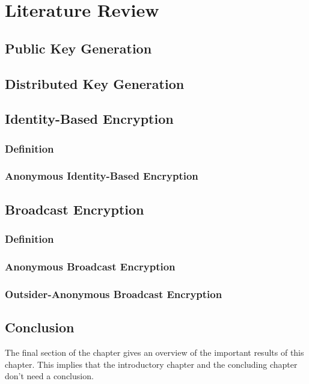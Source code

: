 \chapter{Literature Review}
\label{cha:2}
\lipsum[77]

\section{Public Key Generation}
\lipsum[84]

\section{Distributed Key Generation}
\lipsum[85]

\section{Identity-Based Encryption}
\lipsum[78]

\subsection{Definition}
\lipsum[79]

\subsection{Anonymous Identity-Based Encryption}
\lipsum[80]

\section{Broadcast Encryption}
\lipsum[81]

\subsection{Definition}
\lipsum[82]

\subsection{Anonymous Broadcast Encryption}
\lipsum[83]

\subsection{Outsider-Anonymous Broadcast Encryption}
\lipsum[84]

\section{Conclusion}
The final section of the chapter gives an overview of the important results
of this chapter. This implies that the introductory chapter and the
concluding chapter don't need a conclusion.

\lipsum[66]

